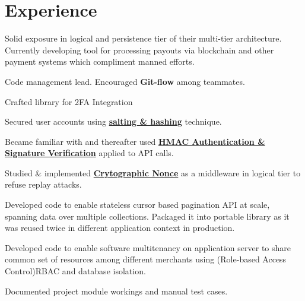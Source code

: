 \documentclass[]{deedy-resume-openfont}
\begin{document}
\begin{minipage}[t]{0.66\textwidth}


\section{Experience}

\vspace{\topsep} %
\begin{tightemize}
\item  Solid exposure in logical and persistence tier of their multi-tier
  architecture. Currently developing tool for processing payouts via blockchain and other payment systems which
  compliment manned efforts.
\item Code management lead. Encouraged \textbf{Git-flow} among teammates.
\item Crafted library for 2FA Integration
\item Secured user accounts using \href{http://swlogs.me/blog/user-auth/}{\textbf{salting \& hashing}} technique.
\item Became familiar with and thereafter used  \href{http://swlogs.me/blog/hmac-authentication/}{\textbf{HMAC Authentication \& Signature Verification}} applied to API calls.
\item Studied \& implemented \href{http://swlogs.me/DIY/nonce-auth-systems/}{\textbf{Crytographic Nonce}} as a middleware in logical tier to refuse replay attacks.
\item Developed code to enable stateless cursor based pagination API at scale, spanning data over multiple
  collections. Packaged it into portable library as it was reused twice in different application context in production.
\item Developed code to enable software multitenancy on application server to share common set of resources among
  different merchants using (Role-based Access Control)RBAC and database isolation.
\item Documented project module workings and manual test cases.
\end{tightemize}
\sectionsep


\end{minipage}
\end{document}
